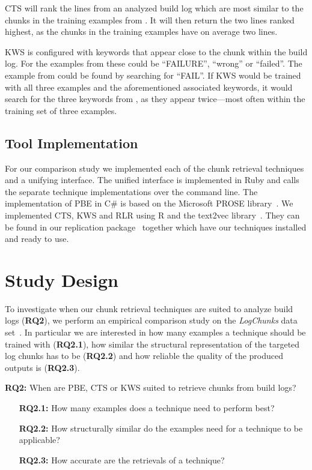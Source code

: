 CTS will rank the lines from an analyzed build log which are most
similar to the chunks in the training examples
from .
It will then return the two lines ranked highest, as the chunks in
the training examples have on average two lines.

KWS is configured with keywords that appear close to the chunk within
the build log.
For the examples from  these could be
``FAILURE'', ``wrong'' or ``failed''.
The example from  could be found
by searching for ``FAIL''.
If KWS would be trained with all three examples and the aforementioned
associated keywords, it would search for the three keywords from
, as they appear twice---most often within
the training set of three examples.

\subsection{Tool Implementation}
For our comparison study we implemented each of the chunk retrieval
techniques and a unifying interface.
The unified interface is implemented in Ruby and
calls the separate technique implementations over the command line.
The implementation of PBE in C\# is based on the Microsoft PROSE
library~\cite{prose2019webpage}.
We implemented CTS, KWS and RLR using
R and the text2vec library~\cite{text2vec2019webpage}.
They can be found in our replication
package~\cite{brandt2020chunk-replication} together which have
our techniques installed and ready to use.

\section{Study Design}
\label{sec:study}

To investigate when our chunk retrieval techniques are suited to
analyze build logs (\textbf{RQ2}), we perform an empirical comparison
study on the \emph{LogChunks} data set~\cite{brandt2020logchunks}.
In particular we are interested in how many examples a technique
should be trained with (\textbf{RQ2.1}),
how similar the structural representation of the targeted log chunks
has to be (\textbf{RQ2.2}) and how reliable the quality of the
produced outputs is (\textbf{RQ2.3}).

\begin{simplebox}[minipage boxed title*=-2.5cm,
attach boxed title to top center={yshift=-6mm}]
{\textbf{RQ2:} When are PBE{,} CTS or KWS suited to
retrieve chunks from build logs?}
\begin{itemize}
  \item[\textbf{RQ2.1:}] How many examples does a technique need to
  perform best?
  \item[\textbf{RQ2.2:}] How structurally similar do the examples
  need for a technique to be applicable?
  \item[\textbf{RQ2.3:}] How accurate are the retrievals of a technique?
\end{itemize}
\end{simplebox}

